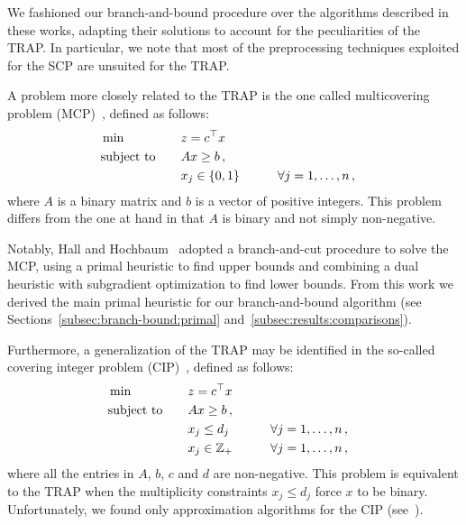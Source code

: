 \documentclass[runningheads]{llncs}
\begin{document}
We fashioned our branch-and-bound procedure over the algorithms described in these works, adapting their solutions to account for the peculiarities of the TRAP. In particular, we note that most of the preprocessing techniques exploited for the SCP are unsuited for the TRAP.

A problem more closely related to the TRAP is the one called multicovering problem (MCP)~\cite{hall-hochbaum-1986-fast-approximation, hall-hochbaum-1992-multicovering}, defined as follows:
\begin{alignat}{3}
  &\min & \quad & z = c^\top x \notag\\
  &\text{subject to}  &       & Ax \ge b \, , \notag\\
  &                   &       & x_j \in \{0, 1\}  & \qquad & \forall j=1,\dots,n \, , \notag
\end{alignat}
where $A$ is a binary matrix and $b$ is a vector of positive integers. This problem differs from the one at hand in that $A$ is binary and not simply non-negative.

Notably, Hall and Hochbaum~\cite{hall-hochbaum-1992-multicovering} adopted a branch-and-cut procedure to solve the MCP, using a primal heuristic to find upper bounds and combining a dual heuristic with subgradient optimization to find lower bounds. From this work we derived the main primal heuristic for our branch-and-bound algorithm (see Sections~\ref{subsec:branch-bound:primal} and~\ref{subsec:results:comparisons}). 

Furthermore, a generalization of the TRAP may be identified in the so-called covering integer problem (CIP)~\cite{kolliopoulos-2003-approximating,kolliopoulos-2005-approximation}, defined as follows:
\begin{alignat}{3}
  &\min & \quad & z = c^\top x \notag\\
  &\text{subject to}  &       & Ax \ge b \, , \notag\\
  &                   &       & x_j \le d_j & \qquad & \forall j=1,\dots,n \, , \notag\\
  &                   &       & x_j \in \mathbb{Z}_{+}  & \qquad &  \forall j=1,\dots,n \, , \notag
\end{alignat}
where all the entries in $A$, $b$, $c$ and $d$ are non-negative. This problem is equivalent to the TRAP when the multiplicity constraints $x_j \le d_j$ force $x$ to be binary. Unfortunately, we found only approximation algorithms for the CIP (see~\cite{kolliopoulos-2003-approximating,kolliopoulos-2005-approximation}).
\end{document}

